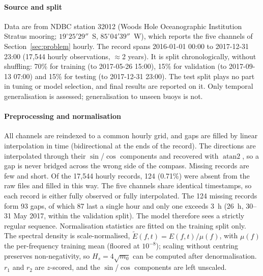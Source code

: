 \paragraph{Source and split}
Data are from NDBC station 32012 (Woods Hole Oceanographic Institution Stratus mooring; $19^\circ25'29''$~S, $85^\circ04'39''$~W), which reports the five channels of Section~\ref{sec:problem} hourly. The record spans 2016-01-01 00:00 to 2017-12-31 23:00 (17,544 hourly observations, $\approx$2 years). It is split chronologically, without shuffling: 70\% for training (to 2017-05-26 15:00), 15\% for validation (to 2017-09-13 07:00) and 15\% for testing (to 2017-12-31 23:00). The test split plays no part in tuning or model selection, and final results are reported on it. Only temporal generalisation is assessed; generalisation to unseen buoys is not.
 
\paragraph{Preprocessing and normalisation}
All channels are reindexed to a common hourly grid, and gaps are filled by linear interpolation in time (bidirectional at the ends of the record). The directions are interpolated through their $\sin$/$\cos$ components and recovered with $\operatorname{atan2}$, so a gap is never bridged across the wrong side of the compass. Missing records are few and short. Of the 17,544 hourly records, 124 (0.71\%) were absent from the raw files and filled in this way. The five channels share identical timestamps, so each record is either fully observed or fully interpolated. The 124 missing records form 93 gaps, of which 87 last a single hour and only one exceeds 3~h (26~h, 30--31 May 2017, within the validation split). The model therefore sees a strictly regular sequence. Normalisation statistics are fitted on the training split only. The spectral density is scale-normalised, $\tilde{E}(f,t) = E(f,t)/\mu(f)$, with $\mu(f)$ the per-frequency training mean (floored at $10^{-8}$); scaling without centring preserves non-negativity, so $H_s = 4\sqrt{m_0}$ can be computed after denormalisation. $r_1$ and $r_2$ are $z$-scored, and the $\sin$/$\cos$ components are left unscaled.

